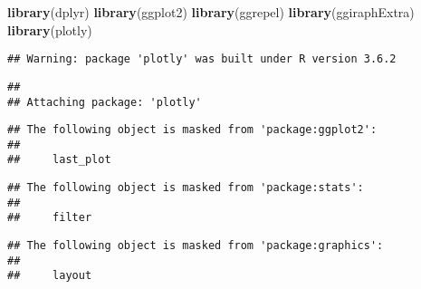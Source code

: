 \documentclass[]{article}
\newenvironment{Shaded}{\begin{snugshade}}{\end{snugshade}}
\newcommand{\KeywordTok}[1]{\textcolor[rgb]{0.13,0.29,0.53}{\textbf{#1}}}
\newcommand{\NormalTok}[1]{#1}
\begin{document}
\begin{Shaded}
\begin{Highlighting}[]
\KeywordTok{library}\NormalTok{(dplyr)}
\KeywordTok{library}\NormalTok{(ggplot2)}
\KeywordTok{library}\NormalTok{(ggrepel)}
\KeywordTok{library}\NormalTok{(ggiraphExtra)}
\KeywordTok{library}\NormalTok{(plotly)}
\end{Highlighting}
\end{Shaded}

\begin{verbatim}
## Warning: package 'plotly' was built under R version 3.6.2
\end{verbatim}

\begin{verbatim}
## 
## Attaching package: 'plotly'
\end{verbatim}

\begin{verbatim}
## The following object is masked from 'package:ggplot2':
## 
##     last_plot
\end{verbatim}

\begin{verbatim}
## The following object is masked from 'package:stats':
## 
##     filter
\end{verbatim}

\begin{verbatim}
## The following object is masked from 'package:graphics':
## 
##     layout
\end{verbatim}
\end{document}
